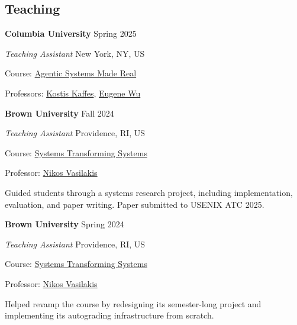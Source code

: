 \documentclass[margin,12pt]{resume}
\newcommand{\descriptionVSpace}{\vspace{0.5ex}\xspace}
\newcommand{\subsectionVSpace}{\vspace{3.5ex}\xspace}
\newcommand{\sectionVSpace}{\vspace{1ex}\xspace} %
\newcommand{\sectionVSpaceCorrection}{\vspace{-3.5ex}} %
\newcommand{\header}[1]{\textbf{#1}\xspace}
\newcommand{\institution}[1]{\header{#1}\xspace}
\newcommand{\place}[1]{#1\xspace}
\newcommand{\role}[1]{\textit{#1}\xspace}
\newcommand{\singleDate}[1]{#1\xspace}
\newcommand{\stitle}[1]{#1:\xspace}
\newenvironment{rSubsection}{}{\par\subsectionVSpace}
\newenvironment{rSection}[1]{\sectionVSpaceCorrection\section{#1}\xspace}{\sectionVSpace\par}
\newenvironment{jobDuties}{\descriptionVSpace}{\par}
\begin{document}
\begin{resume}
    \begin{rSection}{Teaching}
        \begin{rSubsection}
            \institution{Columbia University} \hfill \singleDate{Spring 2025}

            \role{Teaching Assistant} \hfill \place{New York, NY, US}

            \stitle{Course} \href{https://w6113.github.io/}{Agentic Systems Made Real}

            \stitle{Professors} \href{https://www.cs.columbia.edu/~kkaffes/index.html}{Kostis Kaffes}, \href{https://www.cs.columbia.edu/~ewu/}{Eugene Wu}
        \end{rSubsection}

        \begin{rSubsection}
            \institution{Brown University} \hfill \singleDate{Fall 2024}

            \role{Teaching Assistant} \hfill \place{Providence, RI, US}

            \stitle{Course} \href{https://cs.brown.edu/courses/csci2952r/}{Systems Transforming Systems}

            \stitle{Professor} \href{https://nikos.vasilak.is}{Nikos Vasilakis}

            \begin{jobDuties}
                Guided students through a systems research project, including implementation, evaluation, and paper writing.
                Paper submitted to USENIX ATC 2025.
            \end{jobDuties}
        \end{rSubsection}

        \begin{rSubsection}
            \institution{Brown University} \hfill \singleDate{Spring 2024}

            \role{Teaching Assistant} \hfill \place{Providence, RI, US}

            \stitle{Course} \href{https://cs.brown.edu/courses/csci1380/s24/}{Systems Transforming Systems}

            \stitle{Professor} \href{https://nikos.vasilak.is}{Nikos Vasilakis}

            \begin{jobDuties}
                Helped revamp the course by redesigning its semester-long project and implementing its autograding infrastructure from scratch.
            \end{jobDuties}
        \end{rSubsection}


\end{rSection}
\end{resume}
\end{document}
